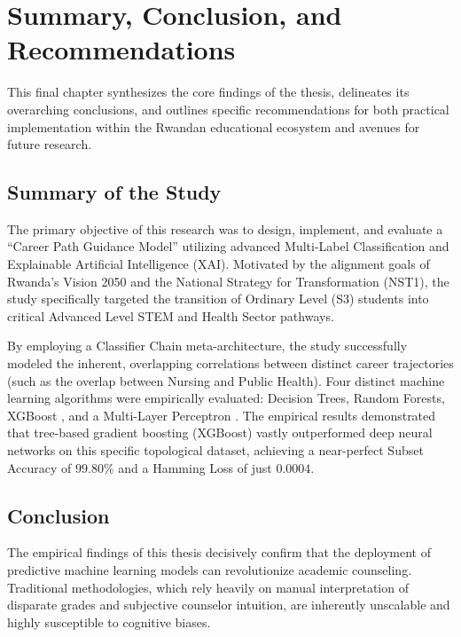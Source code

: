 \section{Summary, Conclusion, and Recommendations} 

This final chapter synthesizes the core findings of the thesis, delineates its overarching conclusions, and outlines specific recommendations for both practical implementation within the Rwandan educational ecosystem and avenues for future research.

\subsection{Summary of the Study}

The primary objective of this research was to design, implement, and evaluate a ``Career Path Guidance Model'' utilizing advanced Multi-Label \parencite{tsoumakas2007multi} Classification and Explainable Artificial Intelligence (XAI). Motivated by the alignment goals of Rwanda's Vision 2050 and the National Strategy for Transformation (NST1), the study specifically targeted the transition of Ordinary Level (S3) students into critical Advanced Level STEM and Health Sector pathways. 

By employing a Classifier Chain \parencite{read2011classifier} meta-architecture, the study successfully modeled the inherent, overlapping correlations between distinct career trajectories (such as the overlap between Nursing and Public Health). Four distinct machine learning algorithms were empirically evaluated: Decision Trees, Random Forests, XGBoost \parencite{chen2016xgboost}, and a Multi-Layer Perceptron \parencite{zhang2013review}. The empirical results demonstrated that tree-based gradient boosting (XGBoost) vastly outperformed deep neural networks on this specific topological dataset, achieving a near-perfect Subset Accuracy of $99.80\%$ and a Hamming Loss of just $0.0004$.

\subsection{Conclusion}

The empirical findings of this thesis decisively confirm that the deployment of predictive machine learning models can revolutionize academic counseling. Traditional methodologies, which rely heavily on manual interpretation of disparate grades and subjective counselor intuition, are inherently unscalable and highly susceptible to cognitive biases. 

